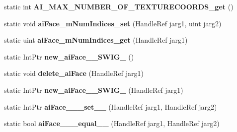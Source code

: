 \begin{DoxyCompactItemize}
\item 
\hypertarget{class_assimp_p_i_n_v_o_k_e_ae27d6f0b79dd277a6da907fdb8a478ab}{static int {\bfseries A\+I\+\_\+\+M\+A\+X\+\_\+\+N\+U\+M\+B\+E\+R\+\_\+\+O\+F\+\_\+\+T\+E\+X\+T\+U\+R\+E\+C\+O\+O\+R\+D\+S\+\_\+get} ()}\label{class_assimp_p_i_n_v_o_k_e_ae27d6f0b79dd277a6da907fdb8a478ab}

\item 
\hypertarget{class_assimp_p_i_n_v_o_k_e_a27de82410d14b8f3a0bf431faacbbf57}{static void {\bfseries ai\+Face\+\_\+m\+Num\+Indices\+\_\+set} (Handle\+Ref jarg1, uint jarg2)}\label{class_assimp_p_i_n_v_o_k_e_a27de82410d14b8f3a0bf431faacbbf57}

\item 
\hypertarget{class_assimp_p_i_n_v_o_k_e_a4331de6c05475ae9196dd2bbd216a14d}{static uint {\bfseries ai\+Face\+\_\+m\+Num\+Indices\+\_\+get} (Handle\+Ref jarg1)}\label{class_assimp_p_i_n_v_o_k_e_a4331de6c05475ae9196dd2bbd216a14d}

\item 
\hypertarget{class_assimp_p_i_n_v_o_k_e_a410f17ea04eb3db3da93e22e902eaab8}{static Int\+Ptr {\bfseries new\+\_\+ai\+Face\+\_\+\+\_\+\+S\+W\+I\+G\+\_} ()}\label{class_assimp_p_i_n_v_o_k_e_a410f17ea04eb3db3da93e22e902eaab8}

\item 
\hypertarget{class_assimp_p_i_n_v_o_k_e_a49b5b02b6638c98cf16359a35c681056}{static void {\bfseries delete\+\_\+ai\+Face} (Handle\+Ref jarg1)}\label{class_assimp_p_i_n_v_o_k_e_a49b5b02b6638c98cf16359a35c681056}

\item 
\hypertarget{class_assimp_p_i_n_v_o_k_e_a84daf71e2c56e24303cf60f9bf0893b9}{static Int\+Ptr {\bfseries new\+\_\+ai\+Face\+\_\+\+\_\+\+S\+W\+I\+G\+\_} (Handle\+Ref jarg1)}\label{class_assimp_p_i_n_v_o_k_e_a84daf71e2c56e24303cf60f9bf0893b9}

\item 
\hypertarget{class_assimp_p_i_n_v_o_k_e_ad5fc1a7bcafd2316f40516bfc0671c59}{static Int\+Ptr {\bfseries ai\+Face\+\_\+\+\_\+\+\_\+set\+\_\+\+\_\+} (Handle\+Ref jarg1, Handle\+Ref jarg2)}\label{class_assimp_p_i_n_v_o_k_e_ad5fc1a7bcafd2316f40516bfc0671c59}

\item 
\hypertarget{class_assimp_p_i_n_v_o_k_e_a9c16b1b3ff62bf60c63e1299f9716a9a}{static bool {\bfseries ai\+Face\+\_\+\+\_\+\+\_\+equal\+\_\+\+\_\+} (Handle\+Ref jarg1, Handle\+Ref jarg2)}\label{class_assimp_p_i_n_v_o_k_e_a9c16b1b3ff62bf60c63e1299f9716a9a}


\end{DoxyCompactItemize}
